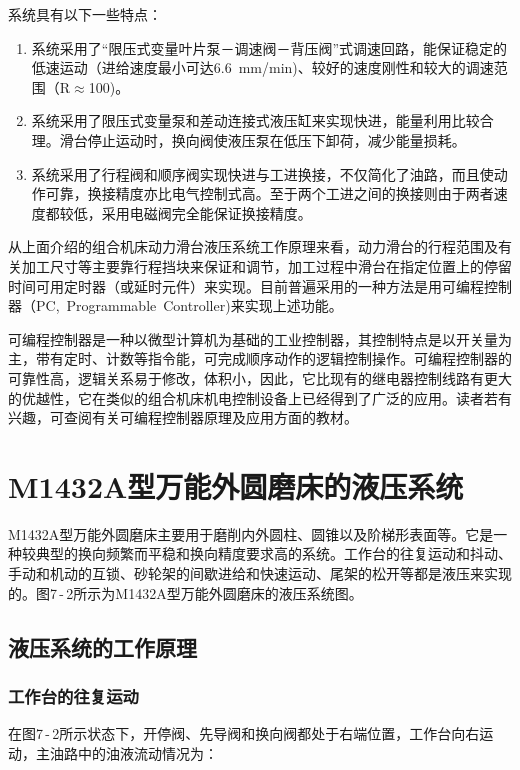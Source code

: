 系统具有以下一些特点：

\begin{enumerate}[(1),leftmargin=0pt,itemindent=3.5\ccwd]
 \item 系统采用了“限压式变量叶片泵－调速阀－背压阀”式调速回路，能保证稳定的低速运动（进给速度最小可达6.6\ mm/min)、较好的速度刚性和较大的调速范围（R$\approx$100)。
 \item 系统采用了限压式变量泵和差动连接式液压缸来实现快进，能量利用比较合理。滑台停止运动时，换向阀使液压泵在低压下卸荷，减少能量损耗。
 \item 系统采用了行程阀和顺序阀实现快进与工进换接，不仅简化了油路，而且使动作可靠，换接精度亦比电气控制式高。至于两个工进之间的换接则由于两者速度都较低，采用电磁阀完全能保证换接精度。
\end{enumerate}

从上面介绍的组合机床动力滑台液压系统工作原理来看，动力滑台的行程范围及有关加工尺寸等主要靠行程挡块来保证和调节，加工过程中滑台在指定位置上的停留时间可用定时器（或延时元件）来实现。目前普遍采用的一种方法是用可编程控制器（PC,\ Programmable\  Controller)来实现上述功能。

可编程控制器是一种以微型计算机为基础的工业控制器，其控制特点是以开关量为主，带有定时、计数等指令能，可完成顺序动作的逻辑控制操作。可编程控制器的可靠性高，逻辑关系易于修改，体积小，因此，它比现有的继电器控制线路有更大的优越性，它在类似的组合机床机电控制设备上已经得到了广泛的应用。读者若有兴趣，可查阅有关可编程控制器原理及应用方面的教材。

\section  {M1432A型万能外圆磨床的液压系统}

M1432A型万能外圆磨床主要用于磨削内外圆柱、圆锥以及阶梯形表面等。它是一种较典型的换向频繁而平稳和换向精度要求高的系统。工作台的往复运动和抖动、手动和机动的互锁、砂轮架的间歇进给和快速运动、尾架的松开等都是液压来实现的。图7\,-\,2所示为M1432A型万能外圆磨床的液压系统图。

\subsection {液压系统的工作原理}

\subsubsection {工作台的往复运动}

在图7\,-\,2所示状态下，开停阀、先导阀和换向阀都处于右端位置，工作台向右运动，主油路中的油液流动情况为：

